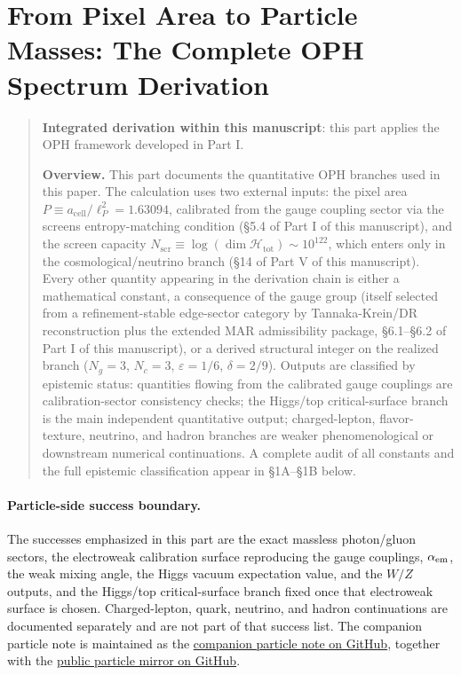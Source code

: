 \section{From Pixel Area to Particle Masses: The Complete OPH Spectrum Derivation}\label{from-pixel-area-to-particle-masses-the-complete-oph-spectrum-derivation}

\begin{quote}
\textbf{Integrated derivation within this manuscript}: this part applies the OPH framework developed in Part I.

\textbf{Overview.} This part documents the quantitative OPH branches used in this paper. The calculation uses two external inputs: the pixel area \(P \equiv a_{\text{cell}}/\ell_P^2 = 1.63094\), calibrated from the gauge coupling sector via the screen\textquotesingle s entropy-matching condition (\S{}5.4 of Part I of this manuscript), and the screen capacity \(N_{\mathrm{scr}} \equiv \log(\dim\mathcal{H}_{\text{tot}}) \sim 10^{122}\), which enters only in the cosmological/neutrino branch (\S{}14 of Part V of this manuscript). Every other quantity appearing in the derivation chain is either a mathematical constant, a consequence of the gauge group (itself selected from a refinement-stable edge-sector category by Tannaka-Krein/DR reconstruction plus the extended MAR admissibility package, \S{}6.1--\S{}6.2 of Part I of this manuscript), or a derived structural integer on the realized branch (\(N_g = 3\), \(N_c = 3\), \(\varepsilon = 1/6\), \(\delta = 2/9\)). Outputs are classified by epistemic status: quantities flowing from the calibrated gauge couplings are calibration-sector consistency checks; the Higgs/top critical-surface branch is the main independent quantitative output; charged-lepton, flavor-texture, neutrino, and hadron branches are weaker phenomenological or downstream numerical continuations. A complete audit of all constants and the full epistemic classification appear in \S{}1A--\S{}1B below.
\end{quote}

\paragraph{Particle-side success boundary.}
The successes emphasized in this part are the exact massless photon/gluon
sectors, the electroweak calibration surface reproducing the gauge
couplings, \(\alpha_{\rm em}\), the weak mixing angle, the Higgs vacuum
expectation value, and the \(W/Z\) outputs, and the Higgs/top
critical-surface branch fixed once that electroweak surface is chosen.
Charged-lepton, quark, neutrino, and hadron continuations are documented
separately and are not part of that success list. The companion particle
note is maintained as the
\href{https://github.com/FloatingPragma/observer-patch-holography/blob/main/paper/toward_a_particle_spectrum_derivation_from_observer_overlap_consistency.pdf}{companion particle note on GitHub},
together with the
\href{https://github.com/FloatingPragma/observer-patch-holography/tree/main/code/particles}{public particle mirror on GitHub}.

